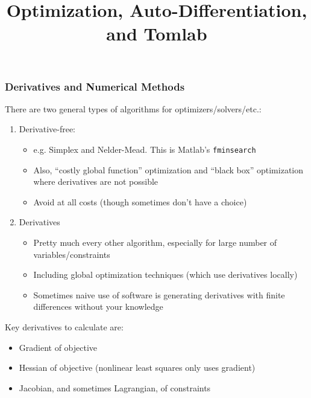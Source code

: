 \documentclass[nofootline]{etk-presentation}
\begin{document}
\title{Optimization, Auto-Differentiation, and Tomlab}
\maketitle
	\begin{frame}\frametitle{}
	\bigskip
	\bigskip
	\bigskip	
	\begin{center}
		{\huge {}}
	\end{center}
\end{frame}
\begin{frame}[fragile]	\frametitle{Derivatives and Numerical Methods}
	There are two general types of algorithms for optimizers/solvers/etc.:
	\begin{enumerate}
		\item Derivative-free:
		\begin{itemize}
			\item e.g. Simplex and Nelder-Mead.  This is Matlab's \verb|fminsearch|
			\item Also, ``costly global function'' optimization and ``black box'' optimization where derivatives are not possible
			\item Avoid at all costs (though sometimes don't have a choice)
		\end{itemize}
	\bigskip
		\item Derivatives
		\begin{itemize}
			\item Pretty much every other algorithm, especially for large number of variables/constraints
			\item Including global optimization techniques (which use derivatives locally)
			\item Sometimes naive use of software is generating derivatives with finite differences without your knowledge
		\end{itemize}	
	\end{enumerate}
\bigskip
Key derivatives to calculate are:
\begin{itemize}
	\item Gradient of objective
	\item Hessian of objective (nonlinear least squares only uses gradient)
	\item Jacobian, and sometimes Lagrangian, of constraints
\end{itemize}


\end{frame}
\end{document}
